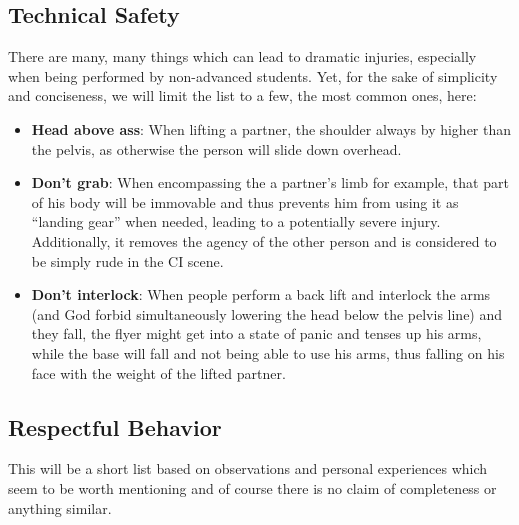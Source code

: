 \subsection{Technical Safety}\label{subsec:technical-safety}

There are many, many things which can lead to dramatic injuries, especially when being performed by non-advanced students.
Yet, for the sake of simplicity and conciseness, we will limit the list to a few, the most common ones, here:

\begin{itemize}
    \item \textbf{Head above ass}: When lifting a partner, the shoulder always by higher than the pelvis, as otherwise the person will slide down overhead.
    \item \textbf{Don't grab}: When encompassing the a partner's limb for example, that part of his body will be immovable and thus prevents him from using it as ``landing gear'' when needed, leading to a potentially severe injury.
    Additionally, it removes the agency of the other person and is considered to be simply rude in the CI scene.
    \item \textbf{Don't interlock}: When people perform a back lift and interlock the arms (and God forbid simultaneously lowering the head below the pelvis line) and they fall, the flyer might get into a state of panic and tenses up his arms, while the base will fall and not being able to use his arms, thus falling on his face with the weight of the lifted partner.
\end{itemize}

\subsection{Respectful Behavior}\label{subsec:respectful-behavior}

This will be a short list based on observations and personal experiences which seem to be worth mentioning and of course there is no claim of completeness or anything similar.

